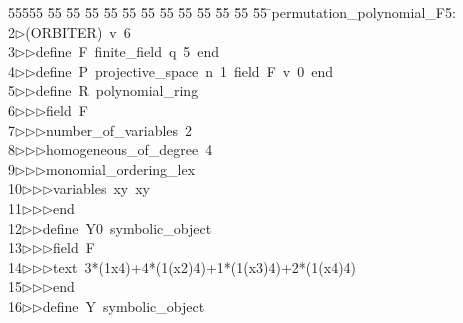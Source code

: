 %
%
\begin{tabbing}
55555 \= 55 \= 55 \= 55 \= 55 \= 55 \= 55 \= 55 \= 55 \= 55 \= 55 \= 55 \= 55 \= \>permutation\_polynomial\_F5:\\[0pt]
2\>$\triangleright$\>(ORBITER)\ v\ 6\ \\[0pt]
3\>$\triangleright$\>$\triangleright$\>define\ F\ finite\_field\ q\ 5\ end\ \\[0pt]
4\>$\triangleright$\>$\triangleright$\>define\ P\ projective\_space\ n\ 1\ field\ F\ v\ 0\ end\ \\[0pt]
5\>$\triangleright$\>$\triangleright$\>define\ R\ polynomial\_ring\ \\[0pt]
6\>$\triangleright$\>$\triangleright$\>$\triangleright$\>field\ F\ \\[0pt]
7\>$\triangleright$\>$\triangleright$\>$\triangleright$\>number\_of\_variables\ 2\ \\[0pt]
8\>$\triangleright$\>$\triangleright$\>$\triangleright$\>homogeneous\_of\_degree\ 4\ \\[0pt]
9\>$\triangleright$\>$\triangleright$\>$\triangleright$\>monomial\_ordering\_lex\ \\[0pt]
10\>$\triangleright$\>$\triangleright$\>$\triangleright$\>variables\ xy\ xy\ \\[0pt]
11\>$\triangleright$\>$\triangleright$\>$\triangleright$\>end\ \\[0pt]
12\>$\triangleright$\>$\triangleright$\>define\ Y0\ symbolic\_object\ \\[0pt]
13\>$\triangleright$\>$\triangleright$\>$\triangleright$\>field\ F\ \\[0pt]
14\>$\triangleright$\>$\triangleright$\>$\triangleright$\>text\ 3*(1x4)+4*(1(x2)4)+1*(1(x3)4)+2*(1(x4)4)\ \\[0pt]
15\>$\triangleright$\>$\triangleright$\>$\triangleright$\>end\ \\[0pt]
16\>$\triangleright$\>$\triangleright$\>define\ Y\ symbolic\_object\ \\[0pt]

\end{tabbing}
